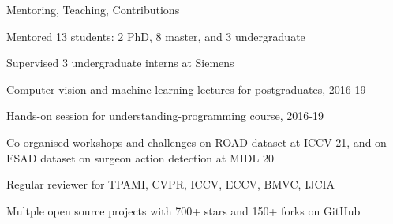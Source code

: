 \documentclass{resume_short} %
\begin{document}
\begin{paracol}{2}


\begin{rSection}{Mentoring, Teaching, Contributions}{} 
\begin{sSubsection}{Mentored 13 students: 2 PhD, 8 master, and 3 undergraduate} \end{sSubsection} %
\begin{sSubsection}{Supervised 3 undergraduate interns at Siemens}\end{sSubsection}
\begin{sSubsection}{Computer vision and machine learning lectures for postgraduates, 2016-19}\end{sSubsection}
\begin{sSubsection}{Hands-on session for understanding-programming course, 2016-19}\end{sSubsection}
\begin{sSubsection}{Co-organised workshops and challenges on ROAD dataset at ICCV 21, and on ESAD dataset on surgeon action detection at MIDL 20}\end{sSubsection}
\begin{sSubsection}{Regular reviewer for TPAMI, CVPR, ICCV, ECCV, BMVC, IJCIA}\end{sSubsection}
\begin{sSubsection}{Multple open source projects with 700+ stars and 150+ forks on GitHub}\end{sSubsection}
\end{rSection}


\end{paracol}
\end{document}
